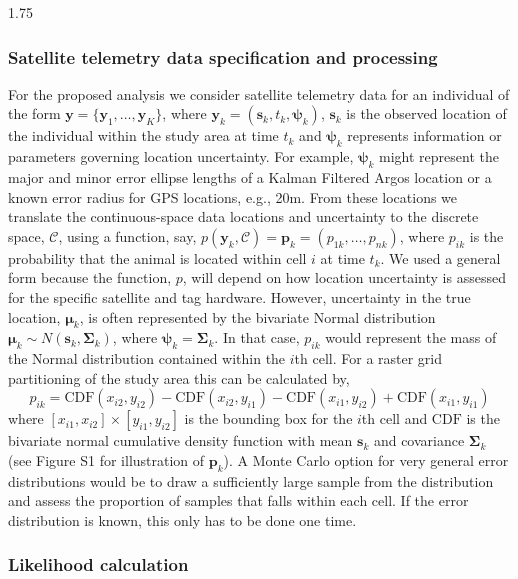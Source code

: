 \documentclass[12pt]{article}
\newcommand{\by}{\ensuremath{\mathbf{y}}}
\newcommand{\bs}{\ensuremath{\mathbf{s}}}
\newcommand{\bp}{\ensuremath{\mathbf{p}}}
\newcommand{\bSig}{\ensuremath{\boldsymbol{\Sigma}}}
\newcommand{\bmu}{\ensuremath{\boldsymbol{\mu}}}
\newcommand{\bpsi}{\ensuremath{\boldsymbol{\psi}}}
\newcommand{\fC}{\ensuremath{\mathcal{C}}}
\begin{document}
\begin{spacing}{1.75}

\subsubsection{Satellite telemetry data specification and processing}
For the proposed analysis we consider satellite telemetry data for an individual of the form $\by = \{\by_1,\dots,\by_K\}$, where $\by_k = (\bs_k, t_k, \bpsi_k)$, $\bs_k$ is the observed location of the individual within the study area at time $t_k$ and $\bpsi_k$ represents information or parameters governing location uncertainty. For example, $\bpsi_k$ might represent the major and minor error ellipse lengths of a Kalman Filtered Argos location \citep{mcclintock2015modelling} or a known error radius for GPS locations, e.g., 20m. From these locations we translate the continuous-space data locations and uncertainty to the discrete space, $\fC$, using a function, say, $p(\by_k,\fC) = \bp_k = (p_{1k},\dots,p_{nk})$, where $p_{ik}$ is the probability that the animal is located within cell $i$ at time $t_k$. We used a general form because the function, $p$, will depend on how location uncertainty is assessed for the specific satellite and tag hardware. However, uncertainty in the true location, $\bmu_k$, is often represented by the bivariate Normal distribution $\bmu_k \sim N(\bs_k, \bSig_k)$, where $\bpsi_k = \bSig_k$. In that case, $p_{ik}$ would represent the mass of the Normal distribution contained within the $i$th cell. For a raster grid partitioning of the study area this can be calculated by,
\[
p_{ik} = \text{CDF}(x_{i2}, y_{i2}) - \text{CDF}(x_{i2}, y_{i1}) - \text{CDF}(x_{i1}, y_{i2}) + \text{CDF}(x_{i1}, y_{i1})
\]    
where $[x_{i1}, x_{i2}] \times [y_{i1}, y_{i2}]$ is the bounding box for the $i$th cell and $\text{CDF}$ is the bivariate normal cumulative density function with mean $\bs_k$ and covariance $\bSig_k$ (see Figure S1 for illustration of $\bp_k$). A Monte Carlo option for very general error distributions would be to draw a sufficiently large sample from the distribution and assess the proportion of samples that falls within each cell. If the error distribution is known, this only has to be done one time.  

\subsubsection{Likelihood calculation}


\end{spacing}
\end{document}
